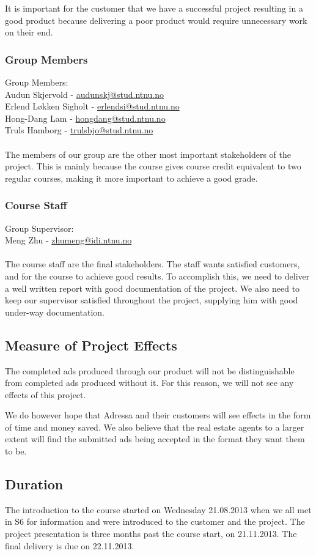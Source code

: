 It is important for the customer that we have a successful project resulting in a good product because delivering a poor product would require unnecessary work on their end.
\subsubsection{Group Members}
Group Members:\\
Audun Skjervold - \href{mailto://audunskj@stud.ntnu.no}{audunskj@stud.ntnu.no}\\
Erlend Løkken Sigholt - \href{mailto://erlendsi@stud.ntnu.no}{erlendsi@stud.ntnu.no}\\
Hong-Dang Lam - \href{mailto://hongdang@stud.ntnu.no}{hongdang@stud.ntnu.no}\\
Truls Hamborg - \href{mailto://trulsbjo@stud.ntnu.no}{trulsbjo@stud.ntnu.no}\\
\\
The members of our group are the other most important stakeholders of the project. This is mainly because the course gives course credit equivalent to two regular courses, making it more important to achieve a good grade.
\subsubsection{Course Staff}
Group Supervisor:\\
Meng Zhu - \href{mailto://zhumeng@idi.ntnu.no}{zhumeng@idi.ntnu.no}\\
\\
The course staff are the final stakeholders. The staff wants satisfied customers, and for the course to achieve good results. To accomplish this, we need to deliver a well written report with good documentation of the project. We also need to keep our supervisor satisfied throughout the project, supplying him with good under-way documentation.

\subsection{Measure of Project Effects}
The completed ads produced through our product will not be distinguishable from completed ads produced without it. For this reason, we will not see any effects of this project.

We do however hope that Adressa and their customers will see effects in the form of time and money saved. We also believe that the real estate agents to a larger extent will find the submitted ads being accepted in the format they want them to be.

\subsection{Duration}
The introduction to the course started on Wednesday 21.08.2013 when we all met in S6 for information and were introduced to the customer and the project.
The project presentation is three months past the course start, on 21.11.2013.
The final delivery is due on 22.11.2013.